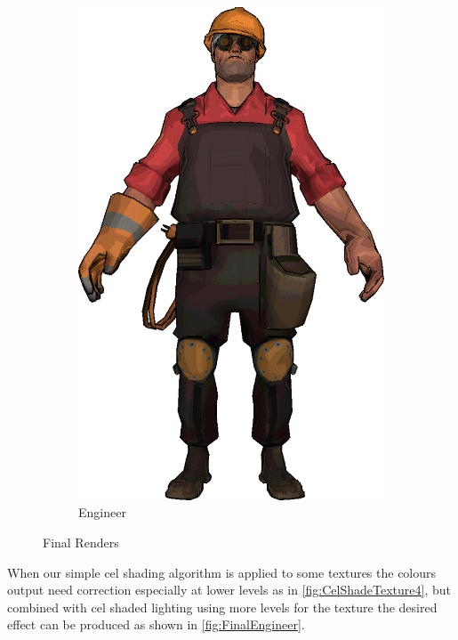 \begin{figure}[h]
\begin{subfigure}[b]{0.18\textwidth}
        \includegraphics[width=\textwidth]{img/Combined/FinalEngineer.png}
        \caption{Engineer}
 		\label{fig:FinalEngineer}
\end{subfigure}
\caption{Final Renders}
 \label{fig:FinalRenders}
\end{figure} 

When our simple cel shading algorithm is applied to some textures the colours output need correction especially 
at lower levels as in \autoref{fig:CelShadeTexture4}, but combined with cel shaded lighting using more levels for the 
texture the desired effect can be produced as shown in \autoref{fig:FinalEngineer}. 

